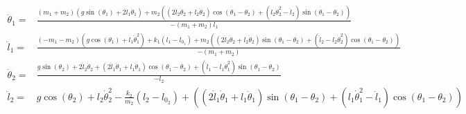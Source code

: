 \documentclass[12pt]{article}
\newenvironment{problem}[2][Problem]
{
	\begin{trivlist} 
		\item[\hskip \labelsep {\bfseries #1 #2:}]
	}
{
	\end{trivlist}
	}
\begin{document}
\begin{problem}{1}
%
%
%
%
%
%
%
%
%
\begin{align*}
\ddot{\theta}_1=&\frac{(m_1  + m_2) (g \sin(\theta_1) + 2 \dot{l}_1 \dot{\theta}_1) + m_2((2 \dot{l}_2 \dot{\theta}_2 + l_2 \ddot{\theta}_2) \cos(\theta_1 - \theta_2) + (l_2 \dot{\theta}_2 ^2  -  \ddot{l}_2)\sin(\theta_1 - \theta_2))}{-(m_1 + m_2) l_1}\\
%
\ddot{l}_1=& \frac{(-m_1 - m_2) (g\cos(\theta_1) + l_1 \dot{\theta}_1 ^2) + k_1 (l_1-l_{0_1}) + m_2 ((2  \dot{l}_2 \dot{\theta}_2 + l_2 \ddot{\theta}_2)\sin(\theta_1 - \theta_2) +(\ddot{l}_2 - l_2 \dot{\theta}_2 ^2)\cos(\theta_1 -\theta_2))}{-(m_1 +m_2)}\\
%
\ddot{\theta}_2 =&\frac{g\sin(\theta_2) + 2\dot{l}_2 \dot{\theta}_2 + (2 \dot{l}_1 \dot{\theta}_1 +  l_1 \ddot{\theta}_1)\cos(\theta_1 - \theta_2) + (\ddot{l}_1 - l_1 \dot{\theta}_1 ^2)\sin(\theta_1 - \theta_2)}{-l_2}\\
%
\ddot{l}_2 =&g \cos(\theta_2) + l_2 \dot{\theta}_2 ^2  -\frac{k_2}{m_2}(l_2 - l_{0_2})  + ((2 \dot{l}_1 \dot{\theta}_1 + l_1 \ddot{\theta}_1 )\sin(\theta_1 - \theta_2) + ( l_1 \dot{\theta}_1 ^2 - \ddot{l}_1)\cos(\theta_1 - \theta_2))
\end{align*}

\end{problem}
\end{document}
